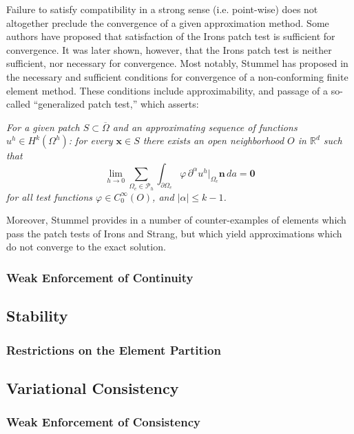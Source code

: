 Failure to satisfy compatibility in a strong sense (i.e. point-wise) does not altogether preclude the convergence of a given approximation method. Some authors have proposed that satisfaction of the Irons patch test is sufficient for convergence. It was later shown, however, that the Irons patch test is neither sufficient, nor necessary for convergence. Most notably, Stummel has proposed in \cite{Stummel:79} the necessary and sufficient conditions for convergence of a non-conforming finite element method. These conditions include approximability, and passage of a so-called ``generalized patch test,'' which asserts:

\textit{For a given patch $S \subset \overline{\Omega}$ and an approximating sequence of functions $u^h \in H^k (\Omega^h)$: for every $\mathbf{x} \in S$ there exists an open neighborhood $O$ in $\mathbb{R}^d$ such that}
\begin{equation}
  \lim_{h \rightarrow 0} \sum_{\Omega_e \in \mathcal{P}_h} \int_{\partial \Omega_e} \varphi \, \partial^\alpha u^h|_{\Omega_e} \mathbf{n} \, da = \mathbf{0}
\end{equation}
\textit{for all test functions $\varphi \in C^{\infty}_0 (O)$, and $| \alpha | \leq k-1$.}

Moreover, Stummel provides in \cite{Stummel:80} a number of counter-examples of elements which pass the patch tests of Irons and Strang, but which yield approximations which do not converge to the exact solution.

\subsubsection{Weak Enforcement of Continuity}
\subsection{Stability}


\subsubsection{Restrictions on the Element Partition}
\subsection{Variational Consistency}
\subsubsection{Weak Enforcement of Consistency}

